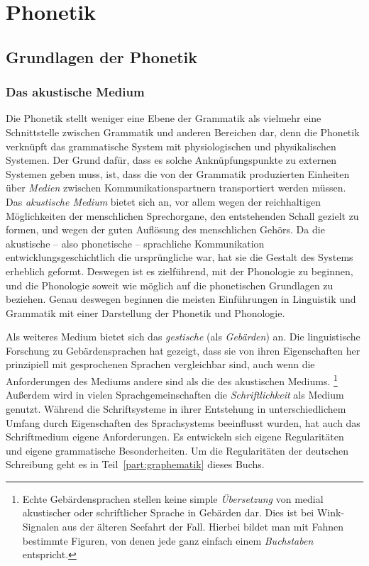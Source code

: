 \chapter{Phonetik}
\label{sec:phonetik}

\section{Grundlagen der Phonetik}
\label{sec:grundlagenderphonetik}

\subsection{Das akustische Medium}
\label{sec:dasakustischemedium}


Die Phonetik stellt weniger eine Ebene der Grammatik als vielmehr eine Schnittstelle zwischen Grammatik und anderen Bereichen dar, denn die Phonetik verknüpft das grammatische System mit physiologischen und physikalischen Systemen.
Der Grund dafür, dass es solche Anknüpfungspunkte zu externen Systemen geben muss, ist, dass die von der Grammatik produzierten Einheiten über \textit{Medien} zwischen Kommunikationspartnern transportiert werden müssen.
Das \textit{akustische Medium} bietet sich an, vor allem wegen der reichhaltigen Möglichkeiten der menschlichen Sprechorgane, den entstehenden Schall gezielt zu formen, und wegen der guten Auflösung des menschlichen Gehörs.
Da die akustische -- also phonetische -- sprachliche Kommunikation entwicklungsgeschichtlich die ursprüngliche war, hat sie die Gestalt des Systems erheblich geformt.
Deswegen ist es zielführend, mit der Phonologie zu beginnen, und die Phonologie soweit wie möglich auf die phonetischen Grundlagen zu beziehen.
Genau deswegen beginnen die meisten Einführungen in Linguistik und Grammatik mit einer Darstellung der Phonetik und Phonologie.

Als weiteres Medium bietet sich das \textit{gestische} (als \textit{Gebärden}) an.
Die linguistische Forschung zu Gebärdensprachen hat gezeigt, dass sie von ihren Eigenschaften her prinzipiell mit gesprochenen Sprachen vergleichbar sind, auch wenn die Anforderungen des Mediums andere sind als die des akustischen Mediums.%
\footnote{Echte Gebärdensprachen stellen keine simple \textit{Übersetzung} von medial akustischer oder schriftlicher Sprache in Gebärden dar.
Dies ist \zB bei Wink-Signalen aus der älteren Seefahrt der Fall.
Hierbei bildet man mit Fahnen bestimmte Figuren, von denen jede ganz einfach einem \textit{Buchstaben} entspricht.}
Außerdem wird in vielen Sprachgemeinschaften die \textit{Schriftlichkeit} als Medium genutzt.
Während die Schriftsysteme in ihrer Entstehung in unterschiedlichem Umfang durch Eigenschaften des Sprachsystems beeinflusst wurden, hat auch das Schriftmedium eigene Anforderungen.
Es entwickeln sich eigene Regularitäten und eigene grammatische Besonderheiten.
Um die Regularitäten der deutschen Schreibung geht es in Teil~\ref{part:graphematik} dieses Buchs.


